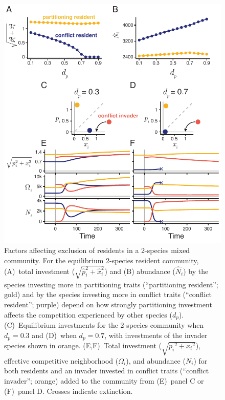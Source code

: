 \documentclass[11pt]{article}
\begin{document}
\begin{figure}[ht!]
\centering
\includegraphics[width=4.75in,keepaspectratio]{5-exclusion}
\caption{Factors affecting exclusion of residents in a
2-species mixed community. For the equilibrium 2-species resident
community, (A)~total investment
($\sqrt{{\hat{p}}_{i}^{2} + {\hat{x}}_{i}^{2}}$) and (B)
abundance (${\hat{N}}_{i}$) by the species investing more in
partitioning traits (``partitioning resident''; gold) and by the species
investing more in conflict traits (``conflict resident''; purple) depend
on how strongly partitioning investment affects the competition
experienced by other species ($d_{p}$). (C)~Equilibrium investments
for the 2-species community when $d_{p} = 0.3$ and (D)~when
$d_{p} = 0.7$, with investments of the invader species shown in orange.
(E,F)~Total investment ($\sqrt{{p_{i}}^{2} + {x_{i}}^{2}}$), effective
competitive neighborhood ($\Omega_{i}$), and abundance ($N_{i}$) for
both residents and an invader invested in conflict traits (``conflict
invader''; orange) added to the community from (E)~panel C or (F)~panel
D. Crosses indicate extinction.}
\label{fig:exclusion}
\end{figure}
\end{document}
